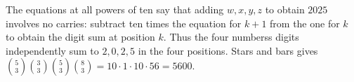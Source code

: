 The equations at all powers of ten say that adding $w,x,y,z$ to obtain $2025$ involves no carries: subtract ten times the equation for $k+1$ from the one for $k$ to obtain the digit sum at position $k$. Thus the four numbers\textquotesingle s digits independently sum to $2,0,2,5$ in the four positions. Stars and bars gives $\binom53\binom33\binom53\binom83=10\cdot1\cdot10\cdot56=\boxed{5600}$.
